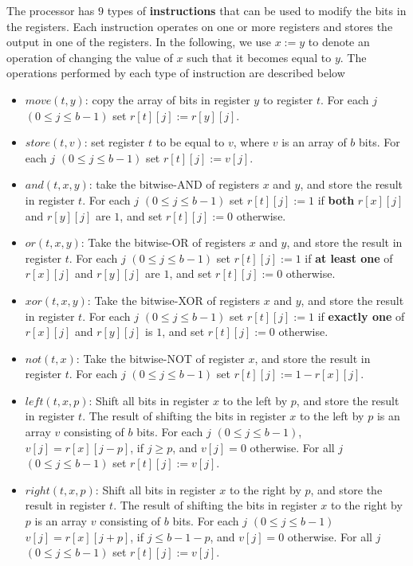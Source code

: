 The processor has $9$ types of \textbf{instructions} that can be used to modify the bits in the registers. Each
instruction operates on one or more registers and stores the output in one of the registers. In the
following, we use $x := y$ to denote an operation of changing the value of $x$ such that it becomes
equal to $y$. The operations performed by each type of instruction are described below
\begin{itemize}
\item $move(t,y)$: copy the array of bits in register $y$ to register $t$. For each $j$ $(0 \leq j \leq b-1)$ set $r[t][j] := r[y][j]$.

\item $store(t,v)$: set register $t$ to be equal to $v$, where $v$ is an array of $b$ bits. For each $j$ $(0 \leq j \leq b-1)$ set $r[t][j] := v[j]$.

\item $and(t,x,y)$: take the bitwise-AND of registers $x$ and $y$, and store the result in register $t$. For
each  $j$ $(0 \leq j \leq b-1)$ set $r[t][j] := 1$ if \textbf{both} $r[x][j]$ and $r[y][j]$ are $1$, and set $r[t][j] := 0$ otherwise.

\item $or(t,x,y)$: Take the bitwise-OR of registers $x$ and $y$, and store the result in register $t$. For each $j$ $(0 \leq j \leq b-1)$ set $r[t][j] := 1$ if \textbf{at least one} of $r[x][j]$ and $r[y][j]$ are $1$, and
set $r[t][j] := 0$ otherwise.

\item $xor(t,x,y)$: Take the bitwise-XOR of registers $x$ and $y$, and store the result in register $t$. For
each  $j$ $(0 \leq j \leq b-1)$ set $r[t][j] := 1$ if \textbf{exactly one} of $r[x][j]$ and $r[y][j]$ is $1$, and set $r[t][j] := 0$ otherwise.

\item $not(t,x)$: Take the bitwise-NOT of register $x$, and store the result in register $t$. For each $j$ $(0 \leq j \leq b-1)$ set $r[t][j] := 1-r[x][j]$.

\item $left(t,x,p)$: Shift all bits in register $x$ to the left by $p$, and store the result in register $t$. The
result of shifting the bits in register $x$ to the left by $p$ is an array $v$ consisting of $b$ bits. For each $j$ $(0 \leq j \leq b-1)$, $v[j] = r[x][j-p]$, if $j \geq p$, and $v[j] = 0$ otherwise. For all $j$ $(0 \leq j \leq b-1)$ set $r[t][j] := v[j]$.

\item $right(t,x,p)$: Shift all bits in register $x$ to the right by $p$, and store the result in register $t$. The result of shifting the bits in register $x$ to the right by $p$ is an array $v$ consisting of $b$ bits. For
each  $j$ $(0 \leq j \leq b-1)$ $v[j] = r[x][j+p]$, if $j \leq b - 1 - p$, and $v[j] = 0$ otherwise. For all $j$ $(0 \leq j \leq b-1)$ set $r[t][j] := v[j]$.


\end{itemize}
